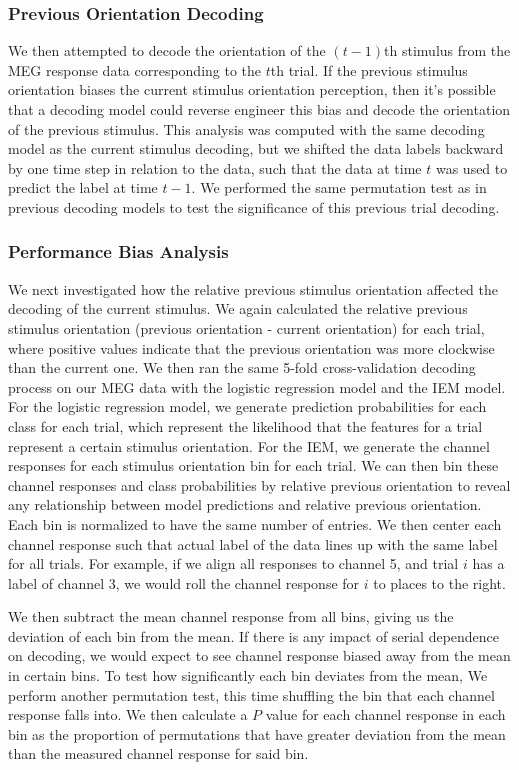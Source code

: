 \documentclass[../main.tex]{subfiles}
\begin{document}
\subsubsection{Previous Orientation Decoding}
We then attempted to decode the orientation of the $(t-1)$th stimulus from the MEG response data corresponding to the $t$th trial. If the previous stimulus orientation biases the current stimulus orientation perception, then it's possible that a decoding model could reverse engineer this bias and decode the orientation of the previous stimulus. This analysis was computed with the same decoding model as the current stimulus decoding, but we shifted the data labels backward by one time step in relation to the data, such that the data at time $t$ was used to predict the label at time $t - 1$. We performed the same permutation test as in previous decoding models to test the significance of this previous trial decoding.

\subsubsection{Performance Bias Analysis}
We next investigated how the relative previous stimulus orientation affected the decoding of the current stimulus. We again calculated the relative previous stimulus orientation (previous orientation - current orientation) for each trial, where positive values indicate that the previous orientation was more clockwise than the current one. We then ran the same 5-fold cross-validation decoding process on our MEG data with the logistic regression model and the IEM model. For the logistic regression model, we generate prediction probabilities for each class for each trial, which represent the likelihood that the features for a trial represent a certain stimulus orientation. For the IEM, we generate the channel responses for each stimulus orientation bin for each trial. We can then bin these channel responses and class probabilities by relative previous orientation to reveal any relationship between model predictions and relative previous orientation. Each bin is normalized to have the same number of entries. We then center each channel response such that actual label of the data lines up with the same label for all trials. For example, if we align all responses to channel 5, and trial $i$ has a label of channel 3, we would roll the channel response for $i$ to places to the right. 

We then subtract the mean channel response from all bins, giving us the deviation of each bin from the mean. If there is any impact of serial dependence on decoding, we would expect to see channel response biased away from the mean in certain bins. To test how significantly each bin deviates from the mean, We perform another permutation test, this time shuffling the bin that each channel response falls into. We then calculate a $P$ value for each channel response in each bin as the proportion of permutations that have greater deviation from the mean than the measured channel response for said bin.
\end{document}
